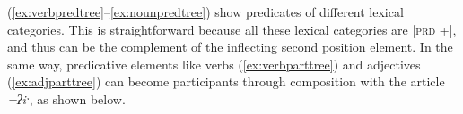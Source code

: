 

(\ref{ex:verbpredtree}--\ref{ex:nounpredtree}) show predicates of different lexical categories. This is straightforward because all these lexical categories are [\textsc{prd} +], and thus can be the complement of the inflecting second position element. In the same way, predicative elements like verbs (\ref{ex:verbparttree}) and adjectives (\ref{ex:adjparttree}) can become participants through composition with the article \textit{=ʔiˑ}, as shown below.

